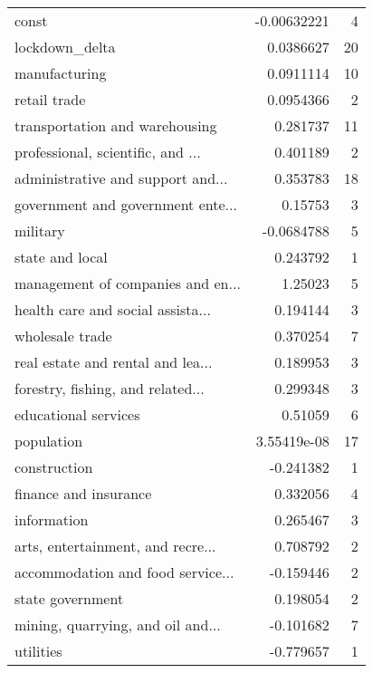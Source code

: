 \begin{tabular}{lrr}
\hline
 const                             & -0.00632221  &  4 \\
 lockdown\_delta                    &  0.0386627   & 20 \\
 manufacturing                     &  0.0911114   & 10 \\
 retail trade                      &  0.0954366   &  2 \\
 transportation and warehousing    &  0.281737    & 11 \\
 professional, scientific, and ... &  0.401189    &  2 \\
 administrative and support and... &  0.353783    & 18 \\
 government and government ente... &  0.15753     &  3 \\
 military                          & -0.0684788   &  5 \\
 state and local                   &  0.243792    &  1 \\
 management of companies and en... &  1.25023     &  5 \\
 health care and social assista... &  0.194144    &  3 \\
 wholesale trade                   &  0.370254    &  7 \\
 real estate and rental and lea... &  0.189953    &  3 \\
 forestry, fishing, and related... &  0.299348    &  3 \\
 educational services              &  0.51059     &  6 \\
 population                        &  3.55419e-08 & 17 \\
 construction                      & -0.241382    &  1 \\
 finance and insurance             &  0.332056    &  4 \\
 information                       &  0.265467    &  3 \\
 arts, entertainment, and recre... &  0.708792    &  2 \\
 accommodation and food service... & -0.159446    &  2 \\
 state government                  &  0.198054    &  2 \\
 mining, quarrying, and oil and... & -0.101682    &  7 \\
 utilities                         & -0.779657    &  1 \\
\hline
\end{tabular}